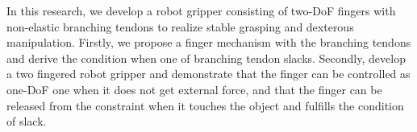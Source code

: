 \documentclass{llncs}
\begin{document}
In this research, we develop a robot gripper consisting of two-DoF fingers
with non-elastic branching tendons to realize stable grasping and dexterous manipulation.
Firstly, we propose a finger mechanism with the branching tendons
and derive the condition when one of branching tendon slacks.
Secondly,  develop a two fingered robot gripper
and demonstrate that the finger can be controlled as one-DoF one
when it does not get external force,
and that the finger can be released from the constraint
when it touches the object and fulfills the condition of slack.
\end{document}
